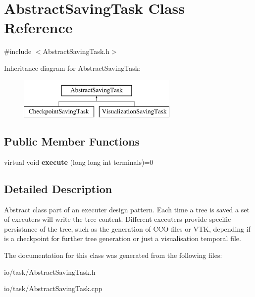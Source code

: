 \hypertarget{class_abstract_saving_task}{}\section{Abstract\+Saving\+Task Class Reference}
\label{class_abstract_saving_task}


{\ttfamily \#include $<$Abstract\+Saving\+Task.\+h$>$}

Inheritance diagram for Abstract\+Saving\+Task\+:\begin{figure}[H]
\begin{center}
\leavevmode
\includegraphics[height=2.000000cm]{d4/da2/class_abstract_saving_task}
\end{center}
\end{figure}
\subsection*{Public Member Functions}
\begin{DoxyCompactItemize}
\item 
virtual void {\bfseries execute} (long long int terminals)=0\hypertarget{class_abstract_saving_task_a77f5a339c32da02cfc87f9834cc15aee}{}\label{class_abstract_saving_task_a77f5a339c32da02cfc87f9834cc15aee}

\end{DoxyCompactItemize}


\subsection{Detailed Description}
Abstract class part of an executer design pattern. Each time a tree is saved a set of executers will write the tree content. Different executers provide specific persistance of the tree, such as the generation of C\+CO files or V\+TK, depending if is a checkpoint for further tree generation or just a visualisation temporal file. 

The documentation for this class was generated from the following files\+:\begin{DoxyCompactItemize}
\item 
io/task/Abstract\+Saving\+Task.\+h\item 
io/task/Abstract\+Saving\+Task.\+cpp\end{DoxyCompactItemize}

